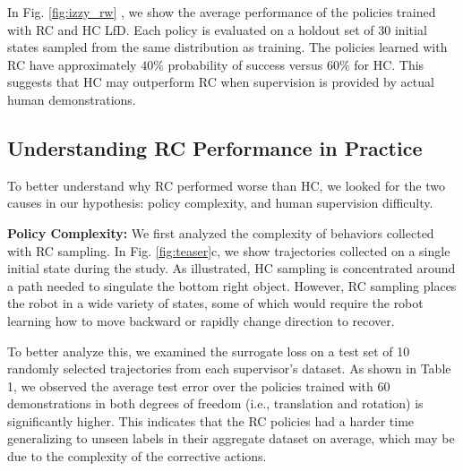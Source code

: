 \documentclass[10pt, conference]{ieeeconf}      %
\begin{document}
In Fig. \ref{fig:izzy_rw} , we show the average performance of the policies trained with RC and HC LfD. Each policy is evaluated on a holdout set of 30 initial states sampled from the same distribution as training.
The policies learned with RC have approximately $40\%$ probability of success versus $60\%$ for HC.
This suggests that HC may outperform RC when supervision is provided by actual human demonstrations.

\subsection{Understanding RC Performance in Practice}
To better understand why RC performed worse than HC, we looked for the two causes in our hypothesis: policy complexity, and human supervision difficulty.

\noindent\textbf{Policy Complexity: }We first analyzed the complexity of behaviors collected with RC sampling. In Fig. \ref{fig:teaser}c, we show trajectories collected on a single initial state during the study. As illustrated, HC sampling is concentrated around a path needed to singulate the bottom right object. However, RC sampling places the robot in a wide variety of states, some of which would require the robot learning how to move backward or rapidly change direction to recover. 

To better analyze this, we examined the surrogate loss on a test set of 10 randomly selected trajectories from each supervisor's dataset.  As shown in Table 1, we observed the average test error over the policies trained with 60 demonstrations in both degrees of freedom (i.e., translation and rotation) is significantly higher.
This indicates that the RC policies had a harder time generalizing to unseen labels in their aggregate dataset on average, which may be due to the complexity of the corrective actions.
\end{document}
